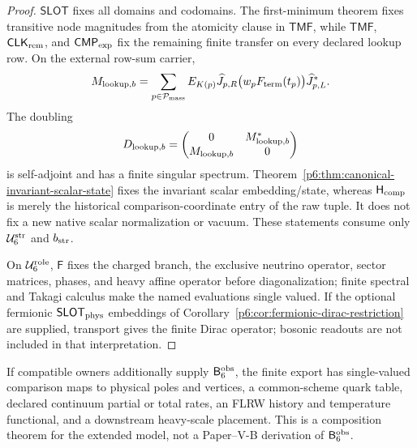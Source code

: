 \documentclass[12pt,a4paper]{article}
\newcommand{\BridgeObs}{\mathsf B_6^{\rm obs}}
\newcommand{\CLKrem}{\mathsf{CLK}_{\rm rem}}
\newcommand{\Ubase}{\mathcal U_6^{\rm str}}
\newcommand{\Urole}{\mathcal U_6^{\rm role}}
\newcommand{\CMPexp}{\mathsf{CMP}_{\rm exp}}
\begin{document}
\begin{proof}
\(\mathsf{SLOT}\) fixes all domains and codomains.
The first-minimum theorem fixes transitive node magnitudes from the atomicity
clause in \(\mathsf{TMF}\), while \(\mathsf{TMF}\), \(\CLKrem\), and
\(\CMPexp\) fix the remaining finite
transfer on every declared lookup row.  On the external row-sum carrier,
\[
M_{{\rm lookup},b}
=
\sum_{p\in\mathcal P_{\rm mass}}
E_{K(p)}\widehat J_{p,R}
\bigl(w_pF_{\rm term}(t_p)\bigr)
\widehat J_{p,L}^* .
\]
The doubling
\[
D_{{\rm lookup},b}
=
\begin{pmatrix}
0&M_{{\rm lookup},b}^*\\
M_{{\rm lookup},b}&0
\end{pmatrix}
\]
is self-adjoint and has a finite singular spectrum.
Theorem~\ref{p6:thm:canonical-invariant-scalar-state} fixes the invariant
scalar embedding/state, whereas \(\mathsf H_{\rm comp}\) is merely the
historical comparison-coordinate entry of the raw tuple. It does not fix a
new native scalar normalization or vacuum.  These statements consume only \(\Ubase\) and
\(b_{\rm str}\).

On \(\Urole\), \(\mathsf F\) fixes the charged branch, the exclusive neutrino
operator, sector matrices, phases, and heavy affine operator before
diagonalization; finite spectral and Takagi calculus make the named
evaluations single valued.  If the optional fermionic
\(\mathsf{SLOT}_{\rm phys}\) embeddings of
Corollary~\ref{p6:cor:fermionic-dirac-restriction} are supplied, transport
gives the finite Dirac operator; bosonic readouts are not included in that
interpretation.
\end{proof}

\begin{corollary}
\label{p6:cor:downstream-extension}
If compatible owners additionally supply \(\BridgeObs\), the finite export
has single-valued comparison maps to physical poles and vertices, a
common-scheme quark table, declared continuum partial or total rates, an FLRW
history and temperature functional, and a downstream heavy-scale placement.
This is a composition theorem for the extended model, not a Paper--V-B
derivation of \(\BridgeObs\).
\end{corollary}
\end{document}
